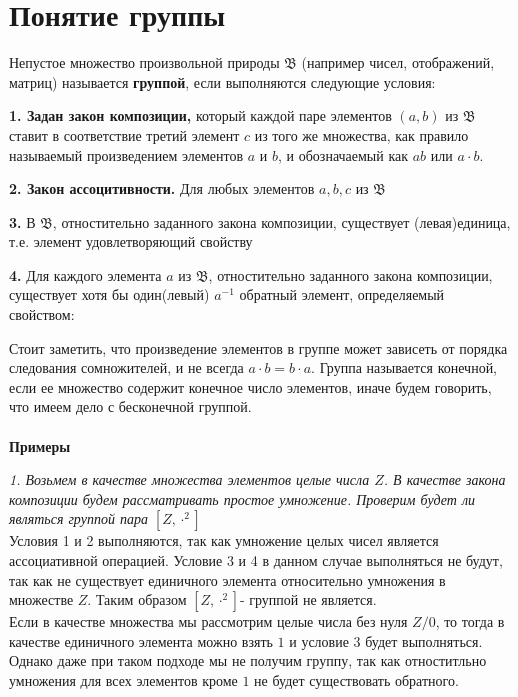 \section{Понятие группы}
{
\begin{Def}
Непустое множество произвольной природы $ \mathfrak {B}$ (например чисел, отображений, матриц) называется \textbf{группой}, если выполняются следующие условия:

\par \textbf{1. Задан закон композиции,} который каждой паре элементов $(a,b)$ из $\mathfrak {B}$ ставит в соответствие третий элемент $c$ из того же множества, как правило называемый произведением элементов $a$ и $b$, и обозначаемый как $ab$ или $a \cdot b$.

\par \textbf{2. Закон ассоцитивности.} Для любых элементов $a,b,c $ из $\mathfrak {B}$ 
\begin{center}
\end{center}

\par \textbf{3.} В $\mathfrak {B}$, отностительно заданного закона композиции, существует (левая)единица, т.е. элемент удовлетворяющий свойству 
\begin{center}

\end{center}

\par \textbf{4.} Для каждого элемента $a$ из $\mathfrak {B}$, отностительно заданного закона композиции, существует хотя бы один(левый) $a^{-1}$ обратный элемент, определяемый свойством: 
\begin{center}

\end{center}
\end{Def}
Стоит заметить, что произведение элементов в группе может зависеть от порядка следования сомножителей, и не всегда $a\cdot b= b\cdot a.$
Группа называется конечной, если ее множество  содержит конечное число элементов, иначе будем говорить, что имеем дело с бесконечной группой.
\\ \\
\textbf{Примеры}

\textit{1. Возьмем в качестве множества элементов целые числа $Z$. В качестве закона композиции будем рассматривать простое умножение. Проверим будет ли являться группой пара $[Z,\cdot^2]$}\\
Условия 1 и 2 выполняются, так как умножение целых чисел является ассоциативной операцией. Условие 3 и 4 в данном случае выполняться не будут, так как не существует единичного элемента относительно умножения в множестве $Z$. Таким образом $[Z, \cdot^2]$- группой не является.\\
Если в качестве множества мы рассмотрим целые числа без нуля $Z/0$, то тогда в качестве единичного элемента можно взять $1$ и условие 3 будет выполняться. Однако даже при таком подходе мы не получим группу, так как отноститльно умножения для всех элементов кроме $1$ не будет существовать обратного.

}
